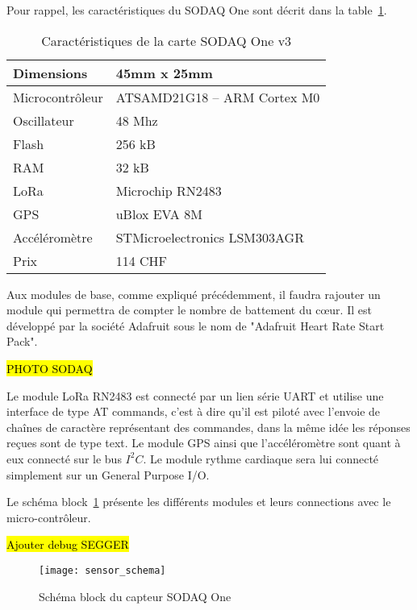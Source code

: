 Pour rappel, les caractéristiques du SODAQ One sont décrit dans la table~\ref{tab:sodaq_one_cara}.

\begin{table}[htb]
\caption[Caractéristiques de la carte SODAQ One v3]{Caractéristiques de la carte SODAQ One v3}
\label{tab:sodaq_one_cara}
\centering
\begin{tabular}{ l | l }
\toprule
Dimensions & 45mm x 25mm \\
\midrule
Microcontrôleur & ATSAMD21G18 – ARM Cortex M0 \\
\midrule
Oscillateur & 48 Mhz \\
\midrule
Flash & 256 kB \\
\midrule
RAM & 32 kB \\
\midrule
LoRa & Microchip RN2483 \\
\midrule
GPS & uBlox EVA 8M \\
\midrule
Accéléromètre & STMicroelectronics LSM303AGR \\
\midrule
Prix & 114 CHF\\
\bottomrule 
\end{tabular}
\end{table}

Aux modules de base, comme expliqué précédemment, il faudra rajouter un module qui permettra de compter le nombre de battement du cœur. Il est développé par la société Adafruit sous le nom de "Adafruit Heart Rate Start Pack".

\hl{PHOTO SODAQ}

Le module LoRa RN2483 est connecté par un lien série UART et utilise une interface de type AT commands, c'est à dire qu'il est piloté avec l'envoie de chaînes de caractère représentant des commandes, dans la même idée les réponses reçues sont de type text. Le module GPS ainsi que l'accéléromètre sont quant à eux connecté sur le bus $I^{2}C$. Le module rythme cardiaque sera lui connecté simplement sur un General Purpose I/O.


Le schéma block~\ref{fig:schema_block_sodaq} présente les différents modules et leurs connections avec le micro-contrôleur.

\hl{Ajouter debug SEGGER}

\begin{figure}[htb]
\centering 
\texttt{[image: sensor\_schema]} 
\caption{Schéma block du capteur SODAQ One}
\label{fig:schema_block_sodaq}
\end{figure}

